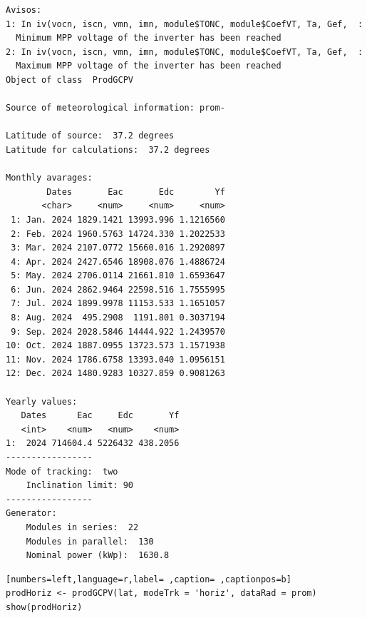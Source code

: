 \begin{verbatim}
Avisos:
1: In iv(vocn, iscn, vmn, imn, module$TONC, module$CoefVT, Ta, Gef,  :
  Minimum MPP voltage of the inverter has been reached
2: In iv(vocn, iscn, vmn, imn, module$TONC, module$CoefVT, Ta, Gef,  :
  Maximum MPP voltage of the inverter has been reached
Object of class  ProdGCPV 

Source of meteorological information: prom- 

Latitude of source:  37.2 degrees
Latitude for calculations:  37.2 degrees

Monthly avarages:
        Dates       Eac       Edc        Yf
       <char>     <num>     <num>     <num>
 1: Jan. 2024 1829.1421 13993.996 1.1216560
 2: Feb. 2024 1960.5763 14724.330 1.2022533
 3: Mar. 2024 2107.0772 15660.016 1.2920897
 4: Apr. 2024 2427.6546 18908.076 1.4886724
 5: May. 2024 2706.0114 21661.810 1.6593647
 6: Jun. 2024 2862.9464 22598.516 1.7555995
 7: Jul. 2024 1899.9978 11153.533 1.1651057
 8: Aug. 2024  495.2908  1191.801 0.3037194
 9: Sep. 2024 2028.5846 14444.922 1.2439570
10: Oct. 2024 1887.0955 13723.573 1.1571938
11: Nov. 2024 1786.6758 13393.040 1.0956151
12: Dec. 2024 1480.9283 10327.859 0.9081263

Yearly values:
   Dates      Eac     Edc       Yf
   <int>    <num>   <num>    <num>
1:  2024 714604.4 5226432 438.2056
-----------------
Mode of tracking:  two 
    Inclination limit: 90 
-----------------
Generator:
    Modules in series:  22 
    Modules in parallel:  130 
    Nominal power (kWp):  1630.8
\end{verbatim}

\begin{lstlisting}[numbers=left,language=r,label= ,caption= ,captionpos=b]
prodHoriz <- prodGCPV(lat, modeTrk = 'horiz', dataRad = prom)
show(prodHoriz)
\end{lstlisting}

